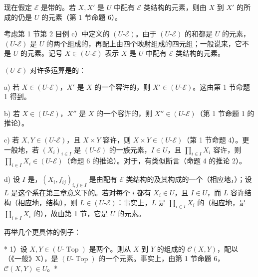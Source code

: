 现在假定 $\mathscr E$ 是带的。若 $X,X'$ 是 $U$ 中配有 $\mathscr E$ 类结构的元素，则由 $X$ 到 $X'$ 的所成的仍是 $U$ 的元素（第 1 节命题 6）。

考虑第 1 节第 2 目例 c）中定义的 $(U\text{-}\mathscr E)$。由于 $(U\text{-}\mathscr E)$ 的和都是 $U$ 的元素，$(U\text{-}\mathscr E)$ 是 $U$ 的两个组成的，再配上由四个映射组成的四元组；一般说来，它不是 $U$ 的元素。记号 $X\in(U\text{-}\mathscr E)$ 表示 $X$ 是 $U$ 中配有 $\mathscr E$ 类结构的元素。

 $(U\text{-}\mathscr E)$ 对许多运算是的：

a) 若 $X\in(U\text{-}\mathscr E)$，$X'$ 是 $X$ 的一个容许的，则 $X'\in(U\text{-}\mathscr E)$。这由第 1 节命题 1 得到。

b) 若 $X\in(U\text{-}\mathscr E)$，$X''$ 是 $X$ 的一个容许的，则 $X''\in(U\text{-}\mathscr E)$（第 1 节命题 1 的推论）。

c) 若 $X,Y\in(U\text{-}\mathscr E)$，且 $X\times Y$ 容许，则 $X\times Y\in(U\text{-}\mathscr E)$（第 1 节命题 4）。更一般地，若 $(X_i)_{i\in I}$ 是 $(U\text{-}\mathscr E)$ 的一族元素，$I\in U$，且 $\prod_{i\in I}X_i$ 容许，则 $\prod_{i\in I}X_i\in(U\text{-}\mathscr E)$（命题 6 的推论）。对于，有类似断言（命题 4 的推论 2）。

d) 设 $I$ 是，$(X_i,f_{ij})_{i,j\in I}$ 是由配有 $\mathscr E$ 类结构的及其构成的一个（相应地，）；设 $L$ 是这个系在第三章意义下的。若对每个 $i$ 都有 $X_i\in U$，且 $I\in U$，而 $L$ 容许结构（相应地，结构），则 $L\in(U\text{-}\mathscr E)$：事实上，$L$ 是 $\prod_{i\in I}X_i$ 的（相应地，是 $\coprod_{i\in I}X_i$ 的），故由第 1 节，它是 $U$ 的元素。

再举几个更具体的例子：

* 1）设 $X,Y\in(U\text{-}\operatorname{Top})$ 是两个。则从 $X$ 到 $Y$ 的组成的 $\mathscr C(X,Y)$，配以（《一般》X），是 $(U\text{-}\operatorname{Top})$ 的一个元素。事实上，由第 1 节命题 6，$\mathscr C(X,Y)\in U$。*

